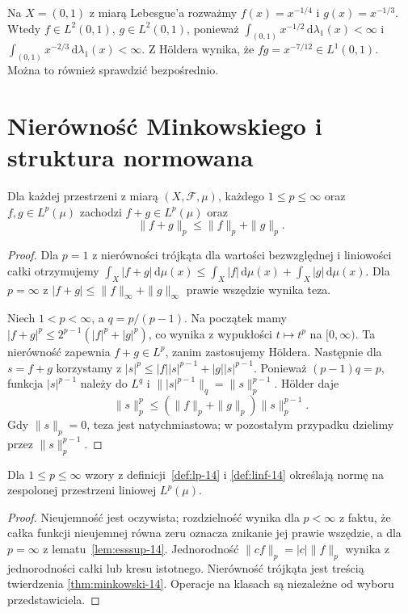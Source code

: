 \begin{przyklad}
Na $X=(0,1)$ z miarą Lebesgue'a rozważmy
$f(x)=x^{-1/4}$ i $g(x)=x^{-1/3}$.
Wtedy $f\in L^2(0,1)$, $g\in L^2(0,1)$,
ponieważ $\int_{(0,1)}x^{-1/2}\,\mathrm d\lambda_1(x)<\infty$
i $\int_{(0,1)}x^{-2/3}\,\mathrm d\lambda_1(x)<\infty$.
Z Höldera wynika, że $fg=x^{-7/12}\in L^1(0,1)$.
Można to również sprawdzić bezpośrednio.
\end{przyklad}

\section{Nierówność Minkowskiego i struktura normowana}
\begin{twierdzenie}[Minkowski]
\label{thm:minkowski-14}
Dla każdej przestrzeni z miarą $(X,\mathcal F,\mu)$,
każdego $1\le p\le\infty$ oraz $f,g\in L^p(\mu)$
zachodzi $f+g\in L^p(\mu)$ oraz
\begin{equation}\label{eq:minkowski-14}
\|f+g\|_p\le\|f\|_p+\|g\|_p.
\end{equation}
\end{twierdzenie}
\begin{proof}
Dla $p=1$ z nierówności trójkąta dla wartości
bezwzględnej i liniowości całki otrzymujemy
$\int_X|f+g|\,\mathrm d\mu(x)\le\int_X|f|\,\mathrm d\mu(x)+
\int_X|g|\,\mathrm d\mu(x)$.
Dla $p=\infty$ z
$|f+g|\le\|f\|_\infty+\|g\|_\infty$ prawie wszędzie
wynika teza.

Niech $1<p<\infty$, a $q=p/(p-1)$.
Na początek mamy
$|f+g|^p\le 2^{p-1}(|f|^p+|g|^p)$,
co wynika z wypukłości $t\mapsto t^p$ na $[0,\infty)$.
Ta nierówność zapewnia $f+g\in L^p$, zanim zastosujemy Höldera.
Następnie dla $s=f+g$ korzystamy z
$|s|^p\le |f||s|^{p-1}+|g||s|^{p-1}$.
Ponieważ $(p-1)q=p$, funkcja $|s|^{p-1}$ należy
do $L^q$ i $\||s|^{p-1}\|_q=\|s\|_p^{p-1}$.
Hölder daje
\[
\|s\|_p^p
\le(\|f\|_p+\|g\|_p)\|s\|_p^{p-1}.
\]
Gdy $\|s\|_p=0$, teza jest natychmiastowa;
w pozostałym przypadku dzielimy przez $\|s\|_p^{p-1}$.
\end{proof}

\begin{wniosek}
\label{cor:lp-normed-14}
Dla $1\le p\le\infty$ wzory z
definicji~\ref{def:lp-14} i \ref{def:linf-14}
określają normę na zespolonej przestrzeni liniowej $L^p(\mu)$.
\end{wniosek}
\begin{proof}
Nieujemność jest oczywista; rozdzielność wynika
dla $p<\infty$ z faktu, że całka funkcji nieujemnej
równa zeru oznacza znikanie jej prawie wszędzie,
a dla $p=\infty$ z lematu~\ref{lem:esssup-14}.
Jednorodność $\|cf\|_p=|c|\|f\|_p$ wynika
z jednorodności całki lub kresu istotnego.
Nierówność trójkąta jest treścią twierdzenia
\ref{thm:minkowski-14}. Operacje na klasach
są niezależne od wyboru przedstawiciela.
\end{proof}

